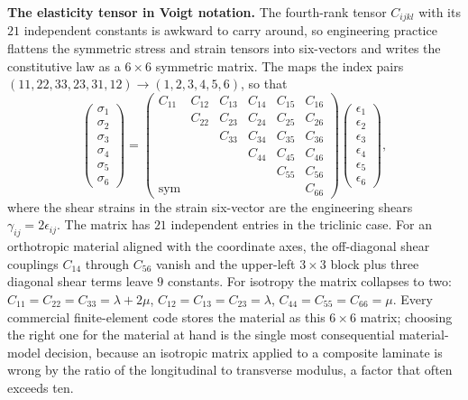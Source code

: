 \begin{mastery}
\textbf{The elasticity tensor in Voigt notation.} The fourth-rank
tensor $C_{ijkl}$ with its $21$ independent constants is awkward to
carry around, so engineering practice flattens the symmetric stress
and strain tensors into six-vectors and writes the constitutive law as
a $6\times 6$ symmetric matrix. The  maps the
index pairs $(11,22,33,23,31,12) \to (1,2,3,4,5,6)$, so that
\[
\begin{pmatrix} \sigma_1 \\ \sigma_2 \\ \sigma_3 \\ \sigma_4 \\
\sigma_5 \\ \sigma_6 \end{pmatrix}
= \begin{pmatrix}
C_{11} & C_{12} & C_{13} & C_{14} & C_{15} & C_{16} \\
       & C_{22} & C_{23} & C_{24} & C_{25} & C_{26} \\
       &        & C_{33} & C_{34} & C_{35} & C_{36} \\
       &        &        & C_{44} & C_{45} & C_{46} \\
       &        &        &        & C_{55} & C_{56} \\
\text{sym} & & & & & C_{66}
\end{pmatrix}
\begin{pmatrix} \epsilon_1 \\ \epsilon_2 \\ \epsilon_3 \\
\epsilon_4 \\ \epsilon_5 \\ \epsilon_6 \end{pmatrix},
\]
where the shear strains in the strain six-vector are the engineering
shears $\gamma_{ij} = 2\epsilon_{ij}$. The matrix has $21$ independent
entries in the triclinic case. For an orthotropic material aligned with
the coordinate axes, the off-diagonal shear couplings $C_{14}$ through
$C_{56}$ vanish and the upper-left $3\times 3$ block plus three
diagonal shear terms leave $9$ constants. For isotropy the matrix
collapses to two: $C_{11} = C_{22} = C_{33} = \lambda + 2\mu$,
$C_{12} = C_{13} = C_{23} = \lambda$, $C_{44} = C_{55} = C_{66} = \mu$.
Every commercial finite-element code stores the material as this
$6\times 6$ matrix; choosing the right one for the material at hand is
the single most consequential material-model decision, because an
isotropic matrix applied to a composite laminate is wrong by the ratio
of the longitudinal to transverse modulus, a factor that often exceeds
ten.
\end{mastery}

